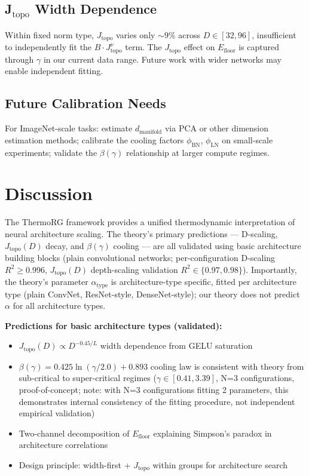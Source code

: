 \documentclass[11pt, a4paper]{article}
\theoremstyle{plain}
\begin{document}
\subsection{J$_{\mathrm{topo}}$ Width Dependence}
Within fixed norm type, $J_{\mathrm{topo}}$ varies only $\sim 9\%$ across $D \in [32, 96]$, insufficient to independently fit the $B \cdot J_{\mathrm{topo}}^{\nu}$ term. The $J_{\mathrm{topo}}$ effect on $E_{\mathrm{floor}}$ is captured through $\gamma$ in our current data range. Future work with wider networks may enable independent fitting.

\subsection{Future Calibration Needs}
For ImageNet-scale tasks: estimate $d_{\mathrm{manifold}}$ via PCA or other dimension estimation methods; calibrate the cooling factors $\phi_{\mathrm{BN}}$, $\phi_{\mathrm{LN}}$ on small-scale experiments; validate the $\beta(\gamma)$ relationship at larger compute regimes.

\section{Discussion}\label{sec:discussion}

The ThermoRG framework provides a unified thermodynamic interpretation of neural architecture scaling. The theory's primary predictions --- D-scaling, $J_{\mathrm{topo}}(D)$ decay, and $\beta(\gamma)$ cooling --- are all validated using basic architecture building blocks (plain convolutional networks; per-configuration D-scaling $R^2 \ge 0.996$, $J_{\mathrm{topo}}(D)$ depth-scaling validation $R^2 \in \{0.97, 0.98\}$). Importantly, the theory's parameter $\alpha_{\mathrm{type}}$ is architecture-type specific, fitted per architecture type (plain ConvNet, ResNet-style, DenseNet-style); our theory does not predict $\alpha$ for all architecture types.

\medskip
\noindent\textbf{Predictions for basic architecture types (validated):}
\begin{itemize}
\item $J_{\mathrm{topo}}(D) \propto D^{-0.45/L}$ width dependence from GELU saturation
\item $\beta(\gamma) = 0.425\ln(\gamma/2.0) + 0.893$ cooling law is consistent with theory from sub-critical to super-critical regimes ($\gamma \in [0.41, 3.39]$, N=3 configurations, proof-of-concept; note: with N=3 configurations fitting 2 parameters, this demonstrates internal consistency of the fitting procedure, not independent empirical validation)
\item Two-channel decomposition of $E_{\mathrm{floor}}$ explaining Simpson's paradox in architecture correlations
\item Design principle: width-first + $J_{\mathrm{topo}}$ within groups for architecture search
\end{itemize}
\end{document}
